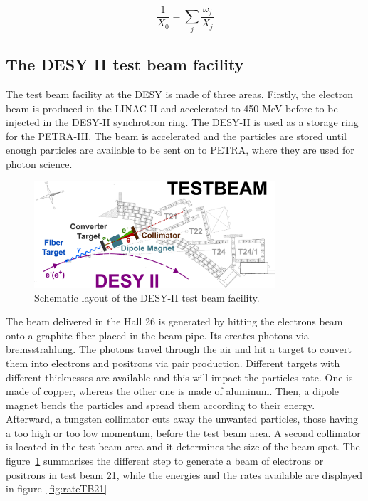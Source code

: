     \begin{equation}
      \frac{1}{X_{0}} = \sum_{j} \frac{\omega_{j}}{X_{j}}
    \end{equation}

    \subsection{The DESY II test beam facility}

    The test beam facility at the \gls{DESY} is made of three areas.
    Firstly, the electron beam is produced in the LINAC-II and accelerated to 450 MeV before to be injected in the DESY-II synchrotron ring.
    The DESY-II is used as a storage ring for the PETRA-III. 
    The beam is accelerated and the particles are stored until enough particles are available to be sent on to PETRA, where they are used for photon science.
    
    \begin{figure}[!h]
      \centering
      \includegraphics[width = 0.8\textwidth]{Pictures/X0/desy_tb-sketch.png}
      \caption{Schematic layout of the DESY-II test beam facility\cite{DESYII}.}
      \label{fig:desyTb-sketch}
    \end{figure}

    The beam delivered in the Hall 26 is generated by hitting the electrons beam onto a graphite fiber placed in the beam pipe.
    Its creates photons via bremsstrahlung.
    The photons travel through the air and hit a target to convert them into electrons and positrons via pair production.
    Different targets with different thicknesses are available and this will impact the particles rate.
    One is made of copper, whereas the other one is made of aluminum.
    Then, a dipole magnet bends the particles and spread them according to their energy.
    Afterward, a tungsten collimator cuts away the unwanted particles, those having a too high or too low momentum, before the test beam area.
    A second collimator is located in the test beam area and it determines the size of the beam spot.
    The figure~\ref{fig:desyTb-sketch} summarises the different step to generate a beam of electrons or positrons in test beam 21, while the energies and the rates available are displayed in figure~\ref{fig:rateTB21}

